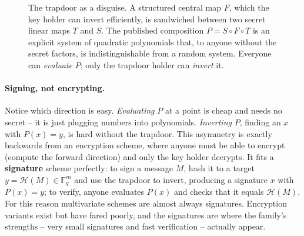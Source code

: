 \begin{figure}[H]
\centering
{}
\caption{The trapdoor as a disguise. A structured central map $F$, which the key holder can invert efficiently, is sandwiched between two secret linear maps $T$ and $S$. The published composition $P = S \circ F \circ T$ is an explicit system of quadratic polynomials that, to anyone without the secret factors, is indistinguishable from a random system. Everyone can \emph{evaluate} $P$; only the trapdoor holder can \emph{invert} it.}
\label{fig:mv-disguise}
\end{figure}

\paragraph{Signing, not encrypting.}
Notice which direction is easy. \emph{Evaluating} $P$ at a point is cheap and needs no secret -- it is just plugging numbers into polynomials. \emph{Inverting} $P$, finding an $x$ with $P(x) = y$, is hard without the trapdoor. This asymmetry is exactly backwards from an encryption scheme, where anyone must be able to encrypt (compute the forward direction) and only the key holder decrypts. It fits a \textbf{signature} scheme perfectly: to sign a message $M$, hash it to a target $y = \mathcal{H}(M) \in \mathbb{F}_q^m$ and use the trapdoor to invert, producing a signature $x$ with $P(x) = y$; to verify, anyone evaluates $P(x)$ and checks that it equals $\mathcal{H}(M)$. For this reason multivariate schemes are almost always signatures. Encryption variants exist but have fared poorly, and the signatures are where the family's strengths -- very small signatures and fast verification -- actually appear.

